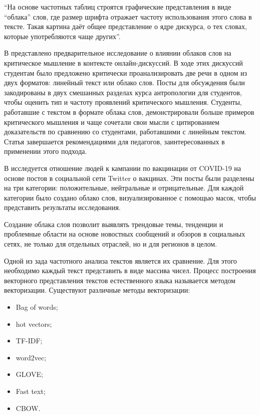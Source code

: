 \documentclass[bachelor, och, coursework ]{SCWorks}
\begin{document}
“На основе частотных таблиц строятся графические представления в виде “облака” слов, где размер шрифта отражает частоту использования этого слова в тексте. Такая картина даёт общее представление о ядре дискурса, о тех словах, которые употребляются чаще других”\cite{3}.  


 В \cite{4} представлено предварительное исследование о влиянии облаков слов на критическое мышление в контексте онлайн-дискуссий. В ходе этих дискуссий студентам было предложено критически проанализировать две речи в одном из двух форматов: линейный текст или облако слов. Посты для обсуждения были закодированы в двух смешанных разделах курса антропологии для студентов, чтобы оценить тип и частоту проявлений критического мышления. Студенты, работавшие с текстом в формате облака слов, демонстрировали больше примеров критического мышления и чаще сочетали свои мысли с цитированием доказательств по сравнению со студентами, работавшими с линейным текстом. Статья завершается рекомендациями для педагогов, заинтересованных в применении этого подхода.



В \cite{6} исследуется отношение людей к кампании по вакцинации от COVID-19 на основе постов в социальной сети Twitter о вакцинах. Эти посты были разделены на три категории: положительные, нейтральные и отрицательные. Для каждой категории было создано облако слов, визуализированное с помощью масок, чтобы представить результаты исследования.

Создание облака слов позволит выявлять трендовые темы, тенденции и проблемные области на основе новостных сообщений и обзоров в социальных сетях, не только для отдельных отраслей, но и для регионов в целом.





Одной из зада частотного анализа текстов является их сравнение. Для этого необходимо каждый текст представить в виде массива чисел. Процесс построения векторного представления текстов естественного языка называется методом векторизации.
Существуют различные методы векторизации:
{\begin{itemize}
    \item Bag of words;
    \item hot vectors;
    \item TF-IDF;
    \item word2vec;
    \item GLOVE;
    \item Fast text;
    \item CBOW.
\end{itemize}}
\end{document}
